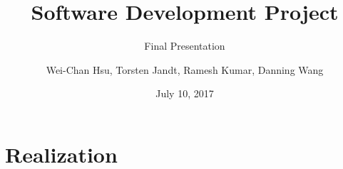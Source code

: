 \documentclass[12pt,aspectratio=43,xcolor={usenames,dvipsnames,table}]{beamer}
\title{Software Development Project}
\subtitle{Final Presentation}
\author{Wei-Chan Hsu, Torsten Jandt, Ramesh Kumar, Danning Wang}
\date{July 10, 2017}
\begin{document}
\begin{frame}
\titlepage
\end{frame}




\section{Realization}




\end{document}

